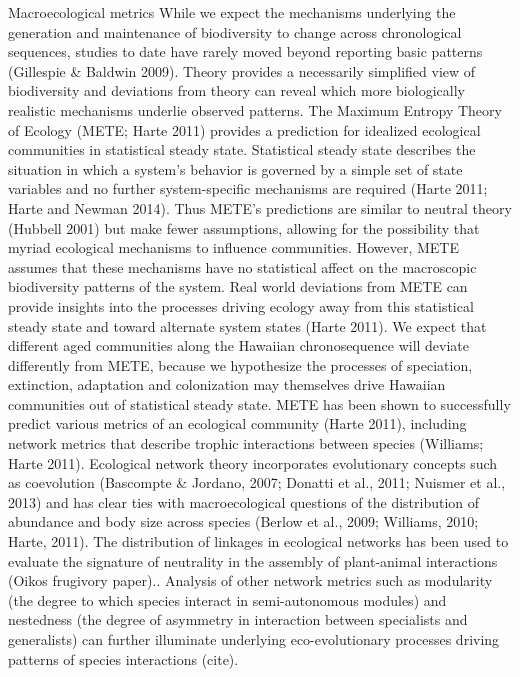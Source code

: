 \documentclass[12pt]{article}
\begin{document}
\begin{linenumbers}
Macroecological metrics 
While we expect the mechanisms underlying the generation and maintenance of biodiversity to change across chronological sequences, studies to date have rarely moved beyond reporting basic patterns (Gillespie & Baldwin 2009). Theory provides a necessarily simplified view of biodiversity and deviations from theory can reveal which more biologically realistic mechanisms underlie observed patterns. The Maximum Entropy Theory of Ecology (METE; Harte 2011) provides a prediction for idealized ecological communities in statistical steady state. Statistical steady state describes the situation in which a system’s behavior is governed by a simple set of state variables and no further system-specific mechanisms are required (Harte 2011; Harte and Newman 2014). Thus METE’s predictions are similar to neutral theory (Hubbell 2001) but make fewer assumptions, allowing for the possibility that myriad ecological mechanisms to influence communities. However, METE assumes that these mechanisms have no statistical affect on the macroscopic biodiversity patterns of the system. Real world deviations from METE can provide insights into the processes driving ecology away from this statistical steady state and toward alternate system states (Harte 2011). We expect that different aged communities along the Hawaiian chronosequence will deviate differently from METE, because we hypothesize the processes of speciation, extinction, adaptation and colonization may themselves drive Hawaiian communities out of statistical steady state.
METE has been shown to successfully predict various metrics of an ecological community (Harte 2011), including network metrics that describe trophic interactions between species (Williams; Harte 2011). Ecological network theory incorporates evolutionary concepts such as coevolution (Bascompte & Jordano, 2007; Donatti et al., 2011; Nuismer et al., 2013) and has clear ties with macroecological questions of the distribution of abundance and body size across species (Berlow et al., 2009; Williams, 2010; Harte, 2011). The distribution of linkages in ecological networks has been used to evaluate the signature of neutrality in the assembly of plant-animal interactions (Oikos frugivory paper).. Analysis of other network metrics such as modularity (the degree to which species interact in semi-autonomous modules) and nestedness (the degree of asymmetry in interaction between specialists and generalists) can further illuminate underlying eco-evolutionary processes driving patterns of species interactions (cite).

\end{linenumbers}
\end{document}
